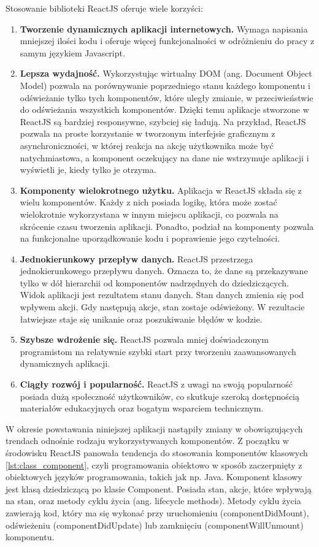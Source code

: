 \documentclass{sprz}
\begin{document}
Stosowanie biblioteki ReactJS oferuje wiele korzyści:
\begin{enumerate}
  \item \textbf{Tworzenie dynamicznych aplikacji internetowych.} Wymaga napisania mniejszej ilości kodu i oferuje więcej funkcjonalności w odróżnieniu do pracy z samym językiem Javascript.
  \item \textbf{Lepsza wydajność.} Wykorzystując wirtualny DOM (ang. Document Object Model) pozwala na porównywanie poprzedniego stanu każdego komponentu i odświeżanie tylko tych komponentów, które uległy zmianie, w przeciwieństwie do odświeżania wszystkich komponentów. Dzięki temu aplikacje stworzone w ReactJS są bardziej responsywne, szybciej się ładują. Na przykład, ReactJS pozwala na proste korzystanie w tworzonym interfejsie graficznym z asynchroniczności, w której reakcja na akcję użytkownika może być natychmiastowa, a komponent oczekujący na dane nie wstrzymuje aplikacji i wyświetli je, kiedy tylko je otrzyma.
  \item \textbf{Komponenty wielokrotnego użytku.} Aplikacja w ReactJS składa się z wielu komponentów. Każdy z nich posiada logikę, która może zostać wielokrotnie wykorzystana w innym miejscu aplikacji, co pozwala na skrócenie czasu tworzenia aplikacji. Ponadto, podział na komponenty pozwala na funkcjonalne uporządkowanie kodu i poprawienie jego czytelności.
  \item \textbf{Jednokierunkowy przepływ danych.} ReactJS przestrzega jednokierunkowego przepływu danych. Oznacza to, że dane są przekazywane tylko w dół hierarchii od komponentów nadrzędnych do dziedziczących. Widok aplikacji jest rezultatem stanu danych. Stan danych zmienia się pod wpływem akcji. Gdy następują akcje, stan zostaje odświeżony. W rezultacie łatwiejsze staje się unikanie oraz poszukiwanie błędów w kodzie.
  \item \textbf{Szybsze wdrożenie się.} ReactJS pozwala mniej doświadczonym programistom na relatywnie szybki start przy tworzeniu zaawansowanych dynamicznych aplikacji.
  \item \textbf{Ciągły rozwój i popularność.} ReactJS z uwagi na swoją popularność posiada dużą społeczność użytkowników, co skutkuje szeroką dostępnością materiałów edukacyjnych oraz bogatym wsparciem technicznym.
\end{enumerate}

W okresie powstawania niniejszej aplikacji nastąpiły zmiany w obowiązujących trendach odnośnie rodzaju wykorzystywanych komponentów. Z początku w środowisku ReactJS panowała tendencja do stosowania komponentów klasowych \ref{lst:class_component}, czyli programowania obiektowo w sposób zaczerpnięty z obiektowych języków programowania, takich jak np. Java. Komponent klasowy jest klasą dziedziczącą po klasie Component. Posiada stan, akcje, które wpływają na stan, oraz metody cyklu życia (ang. lifecycle methods). Metody cyklu życia zawierają kod, który ma się wykonać przy uruchomieniu (componentDidMount), odświeżeniu (componentDidUpdate) lub zamknięciu (componentWillUnmount) komponentu.
\end{document}
